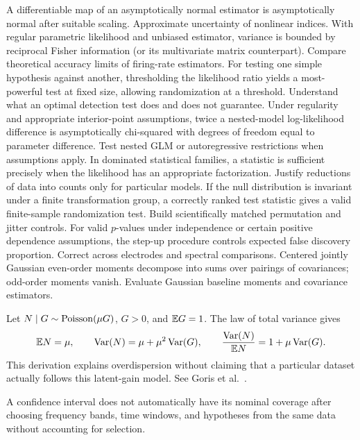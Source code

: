 {A differentiable map of an asymptotically normal estimator
is asymptotically normal after suitable scaling.}
{Approximate uncertainty of nonlinear indices.}
{With regular parametric likelihood and unbiased estimator,
variance is bounded by reciprocal Fisher information
(or its multivariate matrix counterpart).}
{Compare theoretical accuracy limits of firing-rate estimators.}
{For testing one simple hypothesis against another,
thresholding the likelihood ratio yields a most-powerful
test at fixed size, allowing randomization at a threshold.}
{Understand what an optimal detection test does and does not guarantee.}
{Under regularity and appropriate interior-point assumptions,
twice a nested-model log-likelihood difference is asymptotically
chi-squared with degrees of freedom equal to parameter difference.}
{Test nested GLM or autoregressive restrictions when assumptions apply.}
{In dominated statistical families, a statistic is sufficient
precisely when the likelihood has an appropriate factorization.}
{Justify reductions of data into counts only for particular models.}
{If the null distribution is invariant under a finite transformation
group, a correctly ranked test statistic gives a valid finite-sample
randomization test.}
{Build scientifically matched permutation and jitter controls.}
{For valid $p$-values under independence or certain positive
dependence assumptions, the step-up procedure controls
expected false discovery proportion.}
{Correct across electrodes and spectral comparisons.}
{Centered jointly Gaussian even-order moments decompose into
sums over pairings of covariances; odd-order moments vanish.}
{Evaluate Gaussian baseline moments and covariance estimators.}

\begin{example}
Let $N\mid G\sim\operatorname{Poisson}(\mu G)$, $G>0$, and $\mathbb{E} G=1$.
The law of total variance gives
\[
\mathbb{E} N=\mu,\qquad
\operatorname{Var}(N)=\mu+\mu^2\operatorname{Var}(G),\qquad
\frac{\operatorname{Var}(N)}{\mathbb{E} N}=1+\mu\operatorname{Var}(G).
\]
This derivation explains overdispersion without claiming that
a particular dataset actually follows this latent-gain model.
See Goris et al.~\cite{goris2014}.
\end{example}
\begin{caution}
A confidence interval does not automatically have its nominal coverage
after choosing frequency bands, time windows, and hypotheses from
the same data without accounting for selection.
\end{caution}
